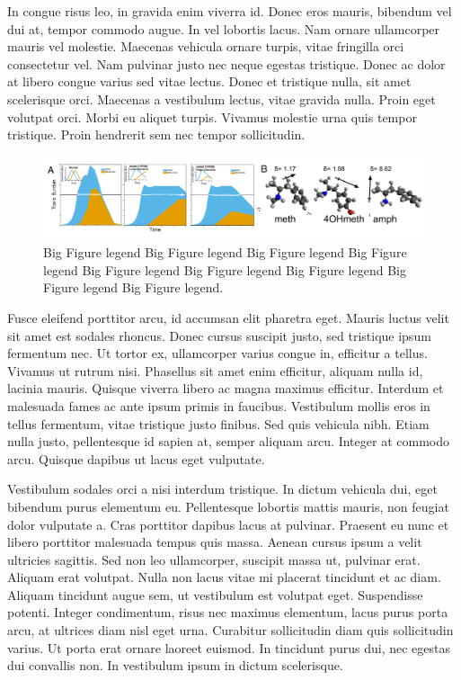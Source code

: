 \documentclass[11pt, notitlepage]{article} %
\begin{document}
In congue risus leo, in gravida enim viverra id. Donec eros mauris, bibendum vel dui at, tempor commodo augue. In vel lobortis lacus. Nam ornare ullamcorper mauris vel molestie. Maecenas vehicula ornare turpis, vitae fringilla orci consectetur vel. Nam pulvinar justo nec neque egestas tristique. Donec ac dolor at libero congue varius sed vitae lectus. Donec et tristique nulla, sit amet scelerisque orci. Maecenas a vestibulum lectus, vitae gravida nulla. Proin eget volutpat orci. Morbi eu aliquet turpis. Vivamus molestie urna quis tempor tristique. Proin hendrerit sem nec tempor sollicitudin.

\begin{figure}[b] %
	\centering
	\includegraphics[scale = .80]{Figures/Fig2.pdf}
	\caption{\footnotesize Big Figure legend Big Figure legend Big Figure legend Big Figure legend Big Figure legend Big Figure legend Big Figure legend Big Figure legend Big Figure legend.}
	\label{fig2}
\end{figure}

Fusce eleifend porttitor arcu, id accumsan elit pharetra eget. Mauris luctus velit sit amet est sodales rhoncus. Donec cursus suscipit justo, sed tristique ipsum fermentum nec. Ut tortor ex, ullamcorper varius congue in, efficitur a tellus. Vivamus ut rutrum nisi. Phasellus sit amet enim efficitur, aliquam nulla id, lacinia mauris. Quisque viverra libero ac magna maximus efficitur. Interdum et malesuada fames ac ante ipsum primis in faucibus. Vestibulum mollis eros in tellus fermentum, vitae tristique justo finibus. Sed quis vehicula nibh. Etiam nulla justo, pellentesque id sapien at, semper aliquam arcu. Integer at commodo arcu. Quisque dapibus ut lacus eget vulputate.

Vestibulum sodales orci a nisi interdum tristique. In dictum vehicula dui, eget bibendum purus elementum eu. Pellentesque lobortis mattis mauris, non feugiat dolor vulputate a. Cras porttitor dapibus lacus at pulvinar. Praesent eu nunc et libero porttitor malesuada tempus quis massa. Aenean cursus ipsum a velit ultricies sagittis. Sed non leo ullamcorper, suscipit massa ut, pulvinar erat. Aliquam erat volutpat. Nulla non lacus vitae mi placerat tincidunt et ac diam. Aliquam tincidunt augue sem, ut vestibulum est volutpat eget. Suspendisse potenti. Integer condimentum, risus nec maximus elementum, lacus purus porta arcu, at ultrices diam nisl eget urna. Curabitur sollicitudin diam quis sollicitudin varius. Ut porta erat ornare laoreet euismod. In tincidunt purus dui, nec egestas dui convallis non. In vestibulum ipsum in dictum scelerisque.
\end{document}
